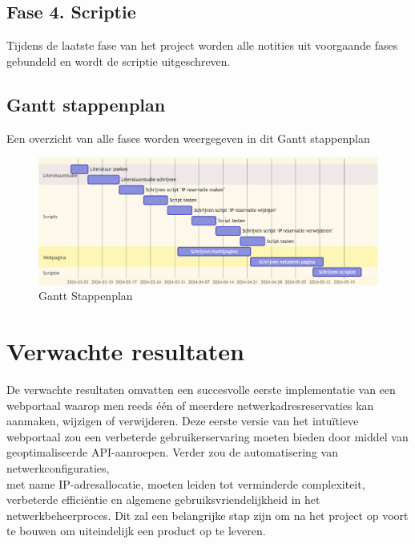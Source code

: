 \documentclass{hogent-article}
\begin{document}
\subsection{Fase 4. Scriptie}
Tijdens de laatste fase van het project worden alle notities uit voorgaande fases gebundeld en wordt de scriptie uitgeschreven.

\subsection{Gantt stappenplan}
Een overzicht van alle fases worden weergegeven in dit Gantt stappenplan
\begin{figure}[h!]
    \includegraphics[scale=0.28]{Gantt}
    \caption{Gantt Stappenplan}
    \label{Gantt Stappenplan}
\end{figure}


\section{Verwachte resultaten}
\label{sec:verwachte-resultaten}
De verwachte resultaten omvatten een succesvolle eerste implementatie van een webportaal waarop men reeds één of meerdere netwerkadresreservaties kan aanmaken, wijzigen of verwijderen. Deze eerste versie van het intuïtieve webportaal zou een verbeterde gebruikerservaring moeten bieden door middel van geoptimaliseerde API-aanroepen. Verder zou de automatisering van netwerkconfiguraties, \\met name IP-adresallocatie, moeten leiden tot verminderde complexiteit, verbeterde efficiëntie en algemene gebruiksvriendelijkheid in het netwerkbeheerproces. Dit zal een belangrijke stap zijn om na het project op voort te bouwen om uiteindelijk een product op te leveren.
\end{document}
